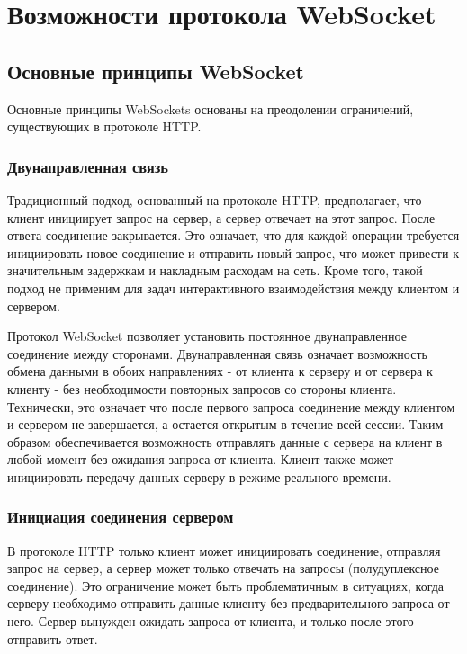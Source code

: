 \chapter{Возможности протокола WebSocket}

\section{Основные принципы WebSocket}

Основные принципы WebSockets основаны на преодолении ограничений, существующих в протоколе HTTP.

\subsection{Двунаправленная связь}

Традиционный подход, основанный на протоколе HTTP, предполагает, что клиент инициирует запрос на сервер, а сервер отвечает на этот запрос. После ответа соединение закрывается. Это означает, что для каждой операции требуется инициировать новое соединение и отправить новый запрос, что может привести к значительным задержкам и накладным расходам на сеть. Кроме того, такой подход не применим для задач интерактивного взаимодействия между клиентом и сервером.

Протокол WebSocket позволяет установить постоянное двунаправленное соединение между сторонами. Двунаправленная связь означает возможность обмена данными в обоих направлениях - от клиента к серверу и от сервера к клиенту - без необходимости повторных запросов со стороны клиента. Технически, это означает что после первого запроса соединение между клиентом и сервером не завершается, а остается открытым в течение всей сессии. Таким образом обеспечивается возможность отправлять данные с сервера на клиент в любой момент без ожидания запроса от клиента. Клиент также может инициировать передачу данных серверу в режиме реального времени.

\subsection{Инициация соединения сервером}

В протоколе HTTP только клиент может инициировать соединение, отправляя запрос на сервер, а сервер может только отвечать на запросы (полудуплексное соединение). Это ограничение может быть проблематичным в ситуациях, когда серверу необходимо отправить данные клиенту без предварительного запроса от него. Сервер вынужден ожидать запроса от клиента, и только после этого отправить ответ.

